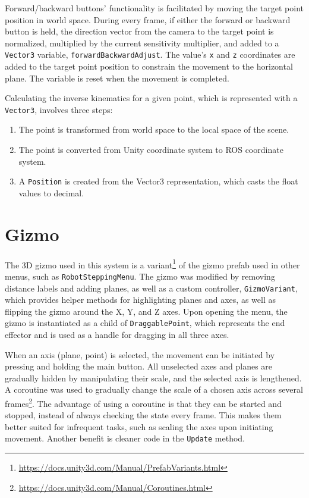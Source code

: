 Forward/backward buttons' functionality is facilitated by moving the target point position in world space. During every frame, if either the forward or backward button is held, the direction vector from the camera to the target point is normalized, multiplied by the current sensitivity multiplier, and added to a \texttt{Vector3} variable, \texttt{forwardBackwardAdjust}. The value's \texttt{x} and \texttt{z} coordinates are added to the target point position to constrain the movement to the horizontal plane. The variable is reset when the movement is completed. 

Calculating the inverse kinematics for a given point, which is represented with a \texttt{Vector3}, involves three steps:
\begin{enumerate}
    \item The point is transformed from world space to the local space of the scene.  
    \item The point is converted from Unity coordinate system to ROS coordinate system.
    \item A \texttt{Position} is created from the Vector3 representation, which casts the float values to decimal.
\end{enumerate}

\section{Gizmo}

The 3D gizmo used in this system is a variant\footnote{\href{https://docs.unity3d.com/Manual/PrefabVariants.html}{https://docs.unity3d.com/Manual/PrefabVariants.html}} of the gizmo prefab used in other menus, such as \texttt{RobotSteppingMenu}. The gizmo was modified by removing distance labels and adding planes, as well as a custom controller, \texttt{GizmoVariant}, which provides helper methods for highlighting planes and axes, as well as flipping the gizmo around the X, Y, and Z axes. Upon opening the menu, the gizmo is instantiated as a child of \texttt{DraggablePoint}, which represents the end effector and is used as a handle for dragging in all three axes.

When an axis (plane, point) is selected, the movement can be initiated by pressing and holding the main button. All unselected axes and planes are gradually hidden by manipulating their scale, and the selected axis is lengthened. A coroutine was used to gradually change the scale of a chosen axis across several frames\footnote{\href{https://docs.unity3d.com/Manual/Coroutines.html}{https://docs.unity3d.com/Manual/Coroutines.html}}. The advantage of using a coroutine is that they can be started and stopped, instead of always checking the state every frame. This makes them better suited for infrequent tasks, such as scaling the axes upon initiating movement. Another benefit is cleaner code in the \texttt{Update} method.

